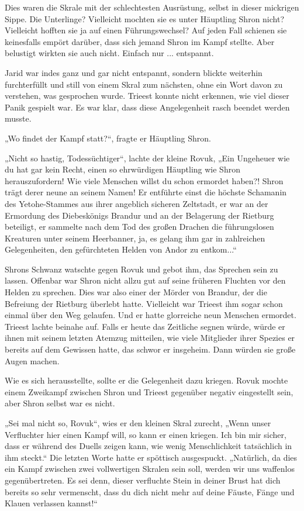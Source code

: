 Dies waren die Skrale mit der schlechtesten Ausrüstung, selbst in dieser mickrigen Sippe. Die Unterlinge? Vielleicht mochten sie es unter Häuptling Shron nicht? Vielleicht hofften sie ja auf einen Führungswechsel? Auf jeden Fall schienen sie keinesfalls empört darüber, dass sich jemand Shron im Kampf stellte. Aber belustigt wirkten sie auch nicht. Einfach nur ... entspannt.

Jarid war indes ganz und gar nicht entspannt, sondern blickte weiterhin furchterfüllt und still von einem Skral zum nächsten, ohne ein Wort davon zu verstehen, was gesprochen wurde. Trieest konnte nicht erkennen, wie viel dieser Panik gespielt war. Es war klar, dass diese Angelegenheit rasch beendet werden musste.

„Wo findet der Kampf statt?“, fragte er Häuptling Shron.

„Nicht so hastig, Todessüchtiger“, lachte der kleine Rovuk, „Ein Ungeheuer wie du hat gar kein Recht, einen so ehrwürdigen Häuptling wie Shron herauszufordern! Wie viele Menschen willst du schon ermordet haben?! Shron trägt derer neune an seinem Namen! Er entführte einst die höchste Schamanin des Yetohe-Stammes aus ihrer angeblich sicheren Zeltstadt, er war an der Ermordung des Diebeskönigs Brandur und an der Belagerung der Rietburg beteiligt, er sammelte nach dem Tod des großen Drachen die führungslosen Kreaturen unter seinem Heerbanner, ja, es gelang ihm gar in zahlreichen Gelegenheiten, den gefürchteten Helden von Andor zu entkom...“

Shrons Schwanz watschte gegen Rovuk und gebot ihm, das Sprechen sein zu lassen. Offenbar war Shron nicht allzu gut auf seine früheren Fluchten vor den Helden zu sprechen. Dies war also einer der Mörder von Brandur, der die Befreiung der Rietburg überlebt hatte. Vielleicht war Trieest ihm sogar schon einmal über den Weg gelaufen. Und er hatte glorreiche neun Menschen ermordet. Trieest lachte beinahe auf. Falls er heute das Zeitliche segnen würde, würde er ihnen mit seinem letzten Atemzug mitteilen, wie viele Mitglieder ihrer Spezies er bereits auf dem Gewissen hatte, das schwor er insgeheim. Dann würden sie große Augen machen.

Wie es sich herausstellte, sollte er die Gelegenheit dazu kriegen. Rovuk mochte einem Zweikampf zwischen Shron und Trieest gegenüber negativ eingestellt sein, aber Shron selbst war es nicht.

„Sei mal nicht so, Rovuk“, wies er den kleinen Skral zurecht, „Wenn unser Verfluchter hier einen Kampf will, so kann er einen kriegen. Ich bin mir sicher, dass er während des Duells zeigen kann, wie wenig Menschlichkeit tatsächlich in ihm steckt.“ Die letzten Worte hatte er spöttisch ausgespuckt. „Natürlich, da dies ein Kampf zwischen zwei vollwertigen Skralen sein soll, werden wir uns waffenlos gegenübertreten. Es sei denn, dieser verfluchte Stein in deiner Brust hat dich bereits so sehr vermenscht, dass du dich nicht mehr auf deine Fäuste, Fänge und Klauen verlassen kannst!“

